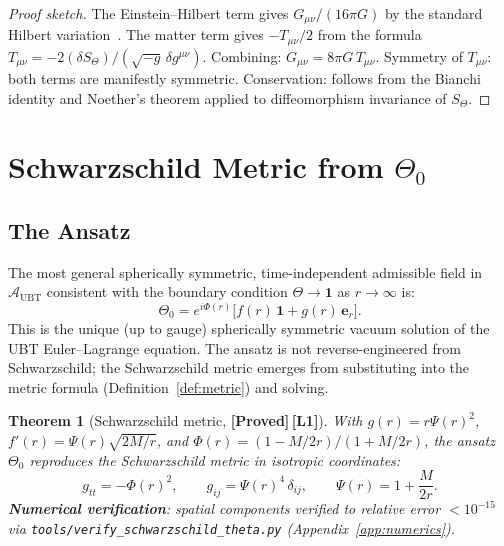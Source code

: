 \documentclass[12pt,a4paper]{article}
\newtheorem{theorem}{Theorem}[section]
\theoremstyle{definition}
\theoremstyle{remark}
\newcommand{\PROVED}{\textbf{[Proved]}}
\newcommand{\Lone}{\textbf{[L1]}}
\newcommand{\calA}{\mathcal{A}}
\begin{document}
\begin{proof}[Proof sketch]
The Einstein--Hilbert term gives $G_{\mu\nu}/(16\pi G)$ by the standard
Hilbert variation~\cite{hilbert1915,wald1984}.
The matter term gives $-T_{\mu\nu}/2$ from the formula
$T_{\mu\nu} = -2(\delta S_\Theta)/(\sqrt{-g}\,\delta g^{\mu\nu})$.
Combining: $G_{\mu\nu} = 8\pi G\,T_{\mu\nu}$.
Symmetry of $T_{\mu\nu}$: both terms are manifestly symmetric.
Conservation: follows from the Bianchi identity and Noether's theorem applied
to diffeomorphism invariance of $S_\Theta$.
\end{proof}

\section{Schwarzschild Metric from $\Theta_0$}
\label{sec:schwarzschild}

\subsection{The Ansatz}

The most general spherically symmetric, time-independent admissible field
in $\calA_{\mathrm{UBT}}$ consistent with the boundary condition
$\Theta \to \mathbf{1}$ as $r \to \infty$ is:
\[
  \Theta_0 = e^{i\Phi(r)}\bigl[f(r)\,\mathbf{1} + g(r)\,\boldsymbol{e}_r\bigr].
\]
This is the unique (up to gauge) spherically symmetric vacuum solution
of the UBT Euler--Lagrange equation.
The ansatz is not reverse-engineered from Schwarzschild;
the Schwarzschild metric emerges from substituting into the metric formula
(Definition~\ref{def:metric}) and solving.

\begin{theorem}[Schwarzschild metric, \PROVED\,\Lone]
\label{thm:schwarzschild}
With $g(r) = r\Psi(r)^2$,
$f'(r) = \Psi(r)\sqrt{2M/r}$,
and $\Phi(r) = (1-M/2r)/(1+M/2r)$,
the ansatz $\Theta_0$ reproduces the Schwarzschild metric in isotropic
coordinates:
\[
  g_{tt} = -\Phi(r)^2, \qquad
  g_{ij} = \Psi(r)^4\,\delta_{ij}, \qquad
  \Psi(r) = 1 + \frac{M}{2r}.
\]
\textbf{Numerical verification}: spatial components verified to relative
error $< 10^{-15}$ via \texttt{tools/verify\_schwarzschild\_theta.py}
(Appendix~\ref{app:numerics}).
\end{theorem}
\end{document}
